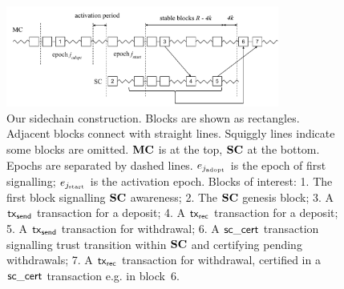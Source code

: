 \begin{figure}[tb]%
  \centering
  \includegraphics[width=0.8\textwidth]{chapters/sidechains/figures/sidechains-overview.pdf}
  \caption{
  Our sidechain construction. Blocks are shown as rectangles. Adjacent blocks
  connect with straight lines. Squiggly lines indicate some blocks are omitted.
  $\mathbf{MC}$ is at the top, $\mathbf{SC}$ at the bottom. Epochs are separated by dashed
  lines. $e_{j_\text{adopt}}$ is the epoch of first signalling;
  $e_{j_\text{start}}$ is the activation epoch. Blocks of interest: 1. The
  first block signalling $\mathbf{SC}$ awareness;
  2. The $\mathbf{SC}$ genesis block; 3. A $\mathsf{tx}_{\mathsf{send}}$
  transaction for a deposit; 4. A $\mathsf{tx}_{\mathsf{rec}}$ transaction for a
  deposit; 5. A $\mathsf{tx}_{\mathsf{send}}$ transaction for withdrawal; 6. A $\mathsf{sc\_cert}$
  transaction signalling trust transition within $\mathbf{SC}$ and certifying pending
  withdrawals; 7. A $\mathsf{tx}_{\mathsf{rec}}$ transaction for withdrawal, certified in a $\mathsf{sc\_cert}$
  transaction e.g. in block~6.
  }
  \label{fig:sidechain}
\end{figure}%


